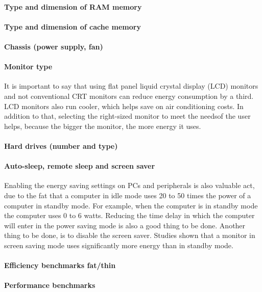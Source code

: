             \paragraph*{Type and dimension of RAM memory}
            \paragraph*{Type and dimension of cache memory}
            \paragraph*{Chassis (power supply, fan)}
            \paragraph*{Monitor type} It is important to say that using flat panel liquid crystal display (LCD) monitors and not conventional CRT monitors can reduce energy consumption by a third. LCD monitors also run cooler, which helps save on air conditioning costs. In addition to that, selecting the right-sized monitor to meet the needsof the user helps, because the bigger the monitor, the more energy it uses.
            \paragraph*{Hard drives (number and type)}
            \paragraph*{Auto-sleep, remote sleep and screen saver} Enabling the energy saving settings on PCs and peripherals is also valuable act, due to the fat that a computer in idle mode uses 20 to 50 times the power of a computer in standby mode. For example, when the computer is in standby mode the computer uses 0 to 6 watts. Reducing the time delay in which the computer will enter in the power saving mode is also a good thing to be done. Another thing to be done, is to disable the screen saver. Studies shown that a monitor in screen saving mode uses significantly more energy than in standby mode.
            \paragraph*{Efficiency benchmarks fat/thin}
            \paragraph*{Performance benchmarks}
